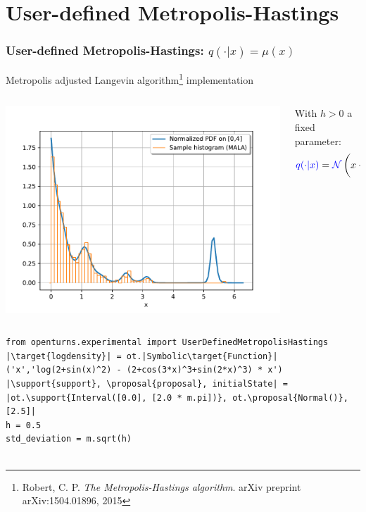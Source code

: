 \documentclass{beamer}
\newcommand{\target}[1]{\textcolor{red}{#1}}
\newcommand{\proposal}[1]{\textcolor{blue}{#1}}
\newcommand{\support}[1]{\textcolor{orange}{#1}}
\begin{document}
\section{User-defined Metropolis-Hastings}
\begin{frame}[containsverbatim]
    \frametitle{User-defined Metropolis-Hastings: $q(\cdot | x) = \mu(x)$}


    \begin{block}{Metropolis adjusted Langevin algorithm\footnote{
        Robert, C. P. \emph{The Metropolis-Hastings algorithm}. arXiv preprint arXiv:1504.01896, 2015} implementation}
        \begin{columns}
            \begin{column}{0.4\textwidth}
                \includegraphics[width=\textwidth]{figures/MALA}
            \end{column}
            \begin{column}{0.6\textwidth}
                With $h>0$ a fixed parameter:
                \begin{equation*}
                    \proposal{q(\cdot | x)} = \proposal{\mathcal{N}}\left(x + \frac{h}{2} \frac{d}{dx} [ \log(\pi(x) ], \sqrt{h} \right)
                \end{equation*}
            \end{column}
        \end{columns}
    \end{block}
\vspace{-0.4cm}
\begin{lstlisting}
from openturns.experimental import UserDefinedMetropolisHastings
|\target{logdensity}| = ot.|Symbolic\target{Function}|('x','log(2+sin(x)^2) - (2+cos(3*x)^3+sin(2*x)^3) * x')
|\support{support}, \proposal{proposal}, initialState| = |ot.\support{Interval([0.0], [2.0 * m.pi])}, ot.\proposal{Normal()}, [2.5]|
h = 0.5
std_deviation = m.sqrt(h)


\end{lstlisting}
\end{frame}
\end{document}
